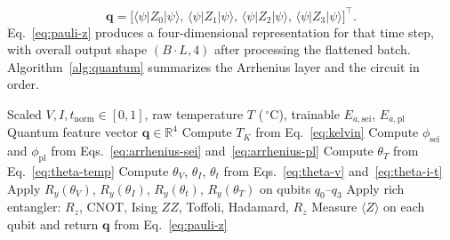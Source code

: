 \documentclass[a4paper,fleqn]{cas-sc}
\begin{document}
\begin{equation}
\mathbf{q}
=
\bigl[
\langle\psi\rvert Z_{0}\lvert\psi\rangle,\,
\langle\psi\rvert Z_{1}\lvert\psi\rangle,\,
\langle\psi\rvert Z_{2}\lvert\psi\rangle,\,
\langle\psi\rvert Z_{3}\lvert\psi\rangle
\bigr]^{\top}.
\label{eq:pauli-z}
\end{equation}
Eq.~\eqref{eq:pauli-z} produces a four-dimensional representation for that time step, with overall output shape $(B \cdot L, 4)$ after processing the flattened batch. Algorithm~\ref{alg:quantum} summarizes the Arrhenius layer and the circuit in order.

\begin{algorithm}[t]
\caption{Physics-informed quantum embedding at one time step (Arrhenius layer and 4-qubit circuit)}
\label{alg:quantum}
\begin{algorithmic}[1]
\Require Scaled $V, I, t_{\mathrm{norm}} \in [0,1]$, raw temperature $T$ (\,$^\circ$C), trainable $E_{a,\mathrm{sei}}$, $E_{a,\mathrm{pl}}$
\Ensure Quantum feature vector $\mathbf{q} \in \mathbb{R}^{4}$
\State Compute $T_K$ from Eq.~\eqref{eq:kelvin}
\State Compute $\phi_{\mathrm{sei}}$ and $\phi_{\mathrm{pl}}$ from Eqs.~\eqref{eq:arrhenius-sei} and~\eqref{eq:arrhenius-pl}
\State Compute $\theta_T$ from Eq.~\eqref{eq:theta-temp}
\State Compute $\theta_V$, $\theta_I$, $\theta_t$ from Eqs.~\eqref{eq:theta-v} and~\eqref{eq:theta-i-t}
\State Apply $R_y(\theta_V)$, $R_y(\theta_I)$, $R_y(\theta_t)$, $R_y(\theta_T)$ on qubits $q_0$--$q_3$
\State Apply rich entangler: $R_z$, CNOT, Ising $ZZ$, Toffoli, Hadamard, $R_z$
\State Measure $\langle Z \rangle$ on each qubit and return $\mathbf{q}$ from Eq.~\eqref{eq:pauli-z}
\end{algorithmic}
\end{algorithm}
\end{document}
